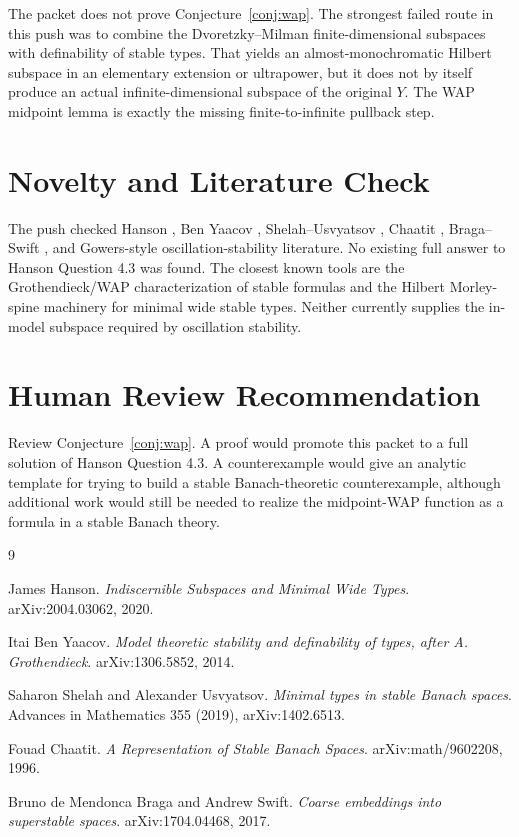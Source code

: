 \documentclass[11pt]{article}
\begin{document}
The packet does not prove Conjecture~\ref{conj:wap}.  The strongest failed
route in this push was to combine the Dvoretzky--Milman finite-dimensional
subspaces with definability of stable types.  That yields an
almost-monochromatic Hilbert subspace in an elementary extension or ultrapower,
but it does not by itself produce an actual infinite-dimensional subspace of
the original \(Y\).  The WAP midpoint lemma is exactly the missing
finite-to-infinite pullback step.

\section*{Novelty and Literature Check}

The push checked Hanson \cite{Hanson2020}, Ben Yaacov \cite{BenYaacov2014},
Shelah--Usvyatsov \cite{ShelahUsvyatsov2019}, Chaatit \cite{Chaatit1996},
Braga--Swift \cite{BragaSwift2017}, and Gowers-style oscillation-stability
literature.  No existing full answer to Hanson Question 4.3 was found.  The
closest known tools are the Grothendieck/WAP characterization of stable
formulas and the Hilbert Morley-spine machinery for minimal wide stable types.
Neither currently supplies the in-model subspace required by oscillation
stability.

\section*{Human Review Recommendation}

Review Conjecture~\ref{conj:wap}.  A proof would promote this packet to a full
solution of Hanson Question 4.3.  A counterexample would give an analytic
template for trying to build a stable Banach-theoretic counterexample, although
additional work would still be needed to realize the midpoint-WAP function as a
formula in a stable Banach theory.

\begin{thebibliography}{9}

James Hanson.
\newblock \emph{Indiscernible Subspaces and Minimal Wide Types}.
\newblock arXiv:2004.03062, 2020.

Itai Ben Yaacov.
\newblock \emph{Model theoretic stability and definability of types, after
A. Grothendieck}.
\newblock arXiv:1306.5852, 2014.

Saharon Shelah and Alexander Usvyatsov.
\newblock \emph{Minimal types in stable Banach spaces}.
\newblock Advances in Mathematics 355 (2019), arXiv:1402.6513.

Fouad Chaatit.
\newblock \emph{A Representation of Stable Banach Spaces}.
\newblock arXiv:math/9602208, 1996.

Bruno de Mendonca Braga and Andrew Swift.
\newblock \emph{Coarse embeddings into superstable spaces}.
\newblock arXiv:1704.04468, 2017.

\end{thebibliography}
\end{document}
